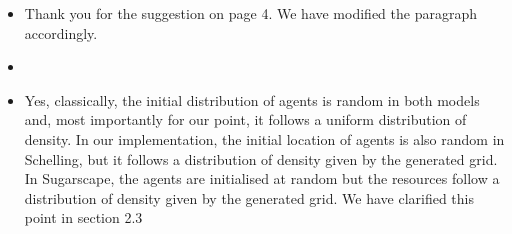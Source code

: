 \documentclass[11pt,a4paper,sans]{moderncv}        %
\begin{document}
\begin{itemize}
	\item Thank you for the suggestion on page 4. We have modified the paragraph accordingly.


	\item 
	
	\item Yes, classically, the initial distribution of agents is random in both models and, most importantly for our point, it follows a uniform distribution of density. In our implementation, the initial location of agents is also random in Schelling, but it follows a distribution of density given by the generated grid. In Sugarscape, the agents are initialised at random but the resources follow a distribution of density given by the generated grid. We have clarified this point in section 2.3
           

\end{itemize}
\end{document}
